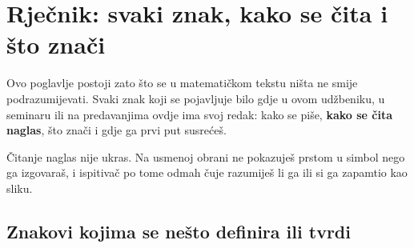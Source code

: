 \chapter{Rječnik: svaki znak, kako se čita i što znači}
\label{ch:rjecnik}

Ovo poglavlje postoji zato što se u matematičkom tekstu ništa ne smije
podrazumijevati. Svaki znak koji se pojavljuje bilo gdje u ovom udžbeniku, u
seminaru ili na predavanjima ovdje ima svoj redak: kako se piše, \textbf{kako se
čita naglas}, što znači i gdje ga prvi put susrećeš.

Čitanje naglas nije ukras. Na usmenoj obrani ne pokazuješ prstom u simbol nego
ga izgovaraš, i ispitivač po tome odmah čuje razumiješ li ga ili si ga zapamtio
kao sliku.

\section{Znakovi kojima se nešto definira ili tvrdi}
\label{sec:znakovi-logike}


